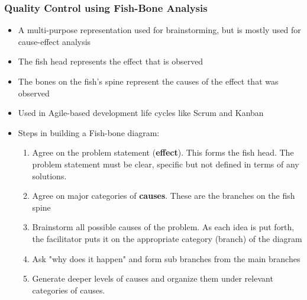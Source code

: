 \documentclass{article}
\begin{document}
\subsubsection{Quality Control using Fish-Bone Analysis}
\begin{itemize}
    \item A multi-purpose representation used for brainstorming, but is mostly used for cause-effect analysis
    
    \item The fish head represents the effect that is observed
    
    \item The bones on the fish's spine represent the causes of the effect that was observed
    
    \item Used in Agile-based development life cycles like Scrum and Kanban
    
    \item Steps in building a Fish-bone diagram:
    \begin{enumerate}
        \item Agree on the problem statement (\textbf{effect}). This forms the fish head. The problem statement must be clear, specific but not defined in terms of any solutions.
        
        \item Agree on major categories of \textbf{causes}. These are the branches on the fish spine
        
        \item Brainstorm all possible causes of the problem. As each idea is put forth, the facilitator puts it on the appropriate category (branch) of the diagram
        
        \item Ask "why does it happen" and form sub branches from the main branches
        
        \item Generate deeper levels of causes and organize them under relevant categories of causes.
    \end{enumerate}
\end{itemize}
\end{document}
